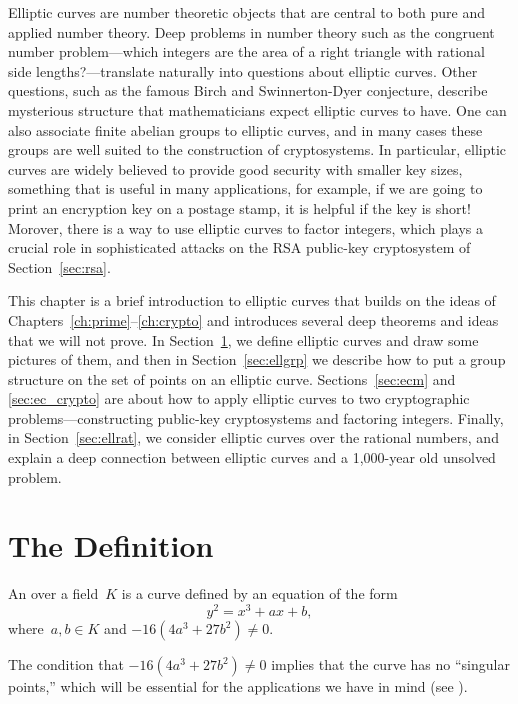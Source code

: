 Elliptic curves are number theoretic objects that are central to both
pure and applied number theory.  Deep problems in number theory such
as the congruent number problem---which integers are the area of a
right triangle with rational side lengths?---translate naturally into
questions about elliptic curves.  Other questions, such as the famous
Birch and Swinnerton-Dyer conjecture, describe mysterious structure
that mathematicians expect elliptic curves to have.  One can also
associate finite abelian groups to elliptic curves, and in many cases
these groups are well suited to the construction of cryptosystems.  In
particular, elliptic curves are widely believed to provide good
security with smaller key sizes, something that is useful in many
applications, for example, if we are going to print an encryption key on a
postage stamp, it is helpful if the key is short!  Morover, there is a
way to use elliptic curves to factor integers, which plays a crucial
role in sophisticated attacks on the RSA public-key cryptosystem of
Section~\ref{sec:rsa}.

This chapter is a brief introduction to elliptic curves that
builds on the ideas of Chapters~\ref{ch:prime}--\ref{ch:crypto} and
introduces several deep theorems and ideas that we will not prove.
In Section~\ref{sec:ecdefn}, we define elliptic curves and draw some
pictures of them, and then in Section~\ref{sec:ellgrp} we describe how to
put a group structure on the set of points on an elliptic curve.
Sections~\ref{sec:ecm} and \ref{sec:ec_crypto} are about how to apply
elliptic curves to two cryptographic problems---constructing
public-key cryptosystems and factoring integers.  Finally, in
Section~\ref{sec:ellrat}, we consider elliptic curves over the rational
numbers, and explain a deep connection between elliptic curves and a
1,000-year old unsolved problem.  \vspace{4ex}


\section{The Definition}\label{sec:ecdefn}

\begin{definition}\label{defn:ec}
An  over a field~$K$ is a curve defined by
an equation of the form
$$
 y^2 = x^3 + ax+b,
$$
where~$a, b\in{}K$ and $-16(4a^3+27b^2)\neq 0$.
\end{definition}

The condition that $-16(4a^3+27b^2)\neq 0$ implies that
the curve has no ``singular points,'' which will be
essential for the applications we have in mind (see
).

